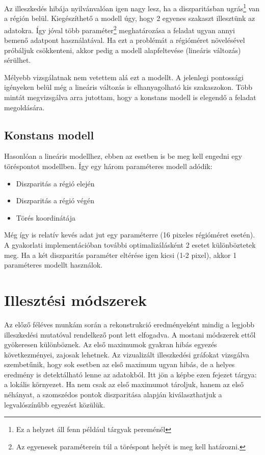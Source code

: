 Az illeszkedés hibája nyilvánvalóan igen nagy lesz, ha a diszparitásban ugrás\footnote{Ez a helyzet áll fenn például tárgyak pereménél} van a régión belül.
Kiegészíthető a modell úgy, hogy 2 egyenes szakaszt illesztünk az adatokra.
Így jóval több paraméter\footnote{Az egyenesek paraméterein túl a töréspont helyét is meg kell határozni.} meghatározása a feladat ugyan annyi bemenő adatpont használatával.
Ha ezt a problémát a régióméret növelésével próbáljuk csökkenteni, akkor pedig a modell alapfeltevése (lineáris változás) sérülhet.

Mélyebb vizsgálatnak nem vetettem alá ezt a modellt.
A jelenlegi pontossági igényeken belül még a lineáris változás is elhanyagolható kis szakaszokon.
Több mintát megvizsgálva arra jutottam, hogy a konstans modell is elegendő a feladat megoldására.

\subsection{Konstans modell}\label{sect:constModel}

Hasonlóan a lineáris modellhez, ebben az esetben is be meg kell engedni egy töréspontot modellben.
Így egy három paraméteres modell adódik:
\begin{itemize}[noitemsep]
\item Diszparitás a régió elején
\item Diszparitás a régió végén
\item Törés koordinátája
\end{itemize}

Még így is relatív kevés adat jut egy paraméterre (16 pixeles régióméret esetén).
A gyakorlati implementációban további optimalizálásként 2 esetet különböztetek meg.
Ha a két diszparitás paraméter eltérése igen kicsi (1-2 pixel), akkor 1 paraméteres modellt használok.

\section{Illesztési módszerek}\label{sect:modelMatch}

Az előző féléves munkám során a rekonstrukció eredményeként mindig a legjobb illeszkedési mutatóval rendelkező pont lett elfogadva.
A mostani módszerek ettől gyökeresen különböznek.
Az első maximumok gyakran hibás egyezés következményei, zajosak lehetnek.
Az vizualizált illeszkedési gráfokat vizsgálva szembetűnik, hogy sok esetben az első maximum ugyan hibás, de a helyes eredmény is detektálható lenne az adatokból.
Itt jön a képbe ezen fejezet tárgya: a lokális környezet.
Ha nem csak az első maximumot tároljuk, hanem az első néhányat, a szomszédos pontok diszparitása alapján kiválaszthatjuk a legvalószínűbb egyezést közülük.

